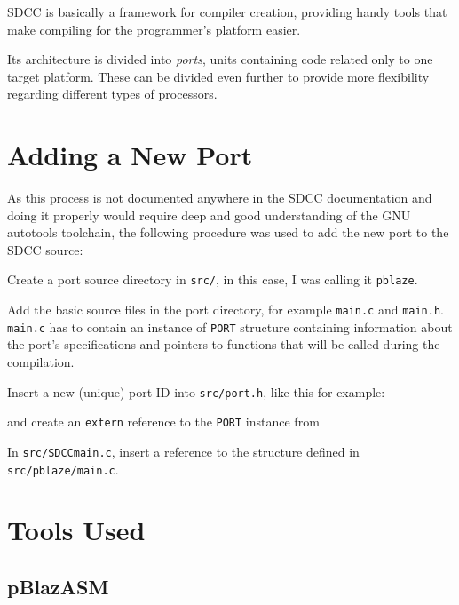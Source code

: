 SDCC is basically a framework for compiler creation, providing handy tools that make compiling for the programmer's platform easier.

Its architecture is divided into \emph{ports}, units containing code related only to one target platform. These can be divided even further to provide more flexibility regarding different types of processors.

    \section{Adding a New Port}

    As this process is not documented anywhere in the SDCC documentation and doing it properly would require deep and good understanding of the GNU autotools toolchain, the following procedure was used to add the new port to the SDCC source:


    Create a port source directory in \texttt{src/}, in this case, I was calling it \texttt{pblaze}.

    Add the basic source files in the port directory, for example \texttt{main.c} and \texttt{main.h}. \texttt{main.c} has to contain an instance of \texttt{PORT} structure containing information about the port's specifications and pointers to functions that will be called during the compilation.

    Insert a new (unique) port ID into \texttt{src/port.h}, like this for example:



    and create an \texttt{extern} reference to the \texttt{PORT} instance from %


    In \texttt{src/SDCCmain.c}, insert a reference to the structure defined in \texttt{src/pblaze/main.c}.

    

    \section{Tools Used}

        \subsection{pBlazASM}

